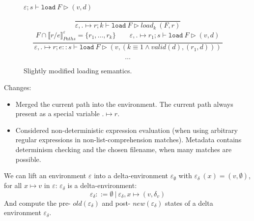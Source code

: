 \documentclass[10pt,twoside,a4paper]{article}
\theoremstyle{theorem}
\theoremstyle{lemma}
\theoremstyle{property}
\begin{document}
\begin{figure}[t]
$\boxed{\varepsilon;s \vdash \mathtt{load}~ F \rhd (v,d)}$

\begin{displaymath}
	\frac{}
	{\varepsilon,. \mapsto r;k \vdash \mathtt{load}~ F \rhd {load}_{k}~(F,r)}
\end{displaymath}
\begin{displaymath}
	\frac{\begin{array}{c}
		F \cap \llbracket r/e \rrbracket^{\varepsilon}_{Paths} = \{r_1,\dots,r_k\}  \quad
		\quad \varepsilon,. \mapsto r_1;s \vdash \mathtt{load}~ F \rhd (v,d)
	\end{array}}
	{\varepsilon,. \mapsto r;e :: s \vdash \mathtt{load}~ F \rhd (v,(k \equiv 1 \wedge valid(d),(r_1,d))) }
\end{displaymath}

\begin{displaymath}
	\dots
\end{displaymath}

\caption{Slightly modified loading semantics.}
\end{figure}

Changes:
\begin{itemize}
	\item Merged the current path into the environment. The current path always present as a special variable $. \mapsto r$.
	\item Considered non-deterministic expression evaluation (when using arbitrary regular expressions in non-list-comprehension matches). Metadata contains determinism checking and the chosen filename, when many matches are possible.
\end{itemize}


We can lift an environment $\varepsilon$ into a delta-environment $\varepsilon_\emptyset$ with $\varepsilon_\delta~(x) = (v,\emptyset)$, for all $x \mapsto v$ in $\varepsilon$:
$\varepsilon_\delta$ is a delta-environment:
\begin{displaymath}
	\varepsilon_\delta ::= \emptyset ~|~ \varepsilon_\delta,x \mapsto (v,\delta_v)
\end{displaymath}
And compute the pre- $old(\varepsilon_\delta)$ and post- $new(\varepsilon_\delta)$ states of a delta environment $\varepsilon_\delta$.
\end{document}

